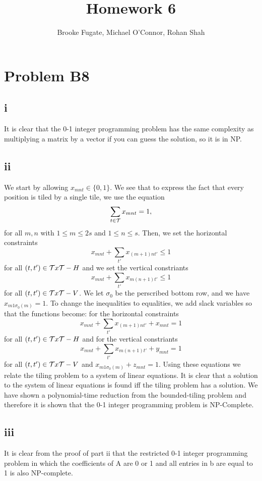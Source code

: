 \documentclass[12pt]{article}
\begin{document}
\pagestyle{plain}
\titleformat{\subsection}[runin]
  {\normalfont\large\bfseries}{\thesubsection}{1em}{}
\titleformat{\subsubsection}[runin]
  {\bfseries}{}{1em}{}

\title{Homework 6}
\author{Brooke Fugate, Michael O'Connor, Rohan Shah}
\date{}

\maketitle

\section*{Problem B8}
\subsection*{i}
It is clear that the 0-1 integer programming problem has the same complexity as multiplying a matrix by a vector if you can guess the solution, so it is in NP.

\subsection*{ii}
We start by allowing $x_{mnt} \in \{0,1\}$.  We see that to express the fact that every position is tiled by a
single tile, we use the equation
\[
\sum_{t\in {\cal T}} x_{m n t} = 1,
\]
for all $m, n$ with $1 \leq m \leq 2 s$ and $1 \leq n \leq s$.
Then, we set the horizontal constraints 
\[
x_{mnt} + \sum_{t'} x_{(m+1) n t'} \le 1
\] 
for all $(t,t') \in {\cal T} x {\cal T} - H$ and we set the vertical constriants 
\[
x_{mnt} + \sum_{t'} x_{m (n+1) t'} \le 1
\] 
for all $(t,t') \in {\cal T} x {\cal T} - V$.  We let $\sigma_0$ be the perscribed bottom row, and we have $x_{m1\sigma_0 (m)} = 1$. To change the inequalities to equalities, we add slack variables so that the functions become: for the horizontal constraints
\[
x_{mnt} + \sum_{t'} x_{(m+1) n t'} + x_{mnt} = 1
\]
for all $(t,t') \in {\cal T} x {\cal T} - H$ and for the vertical constriants
\[
x_{mnt} + \sum_{t'} x_{m (n+1) t'} + y_{mnt}  = 1
\]
for all $(t,t') \in {\cal T} x {\cal T} - V$ and $x_{m1\sigma_0 (m)} + z_{mnt} = 1$.
Using these equations we relate the tiling problem to a system of linear equations.  It is clear that a solution to the system of linear equations is found iff the tiling problem has a solution. We have shown a polynomial-time reduction from the bounded-tiling problem and therefore it is shown that the 0-1 integer programming problem is NP-Complete.  

\subsection*{iii}
It is clear from the proof of part ii that the restricted 0-1 integer programming problem in which the coefficients of A are 0 or 1 and all entries in b are equal to 1 is also NP-complete.
\end{document}
